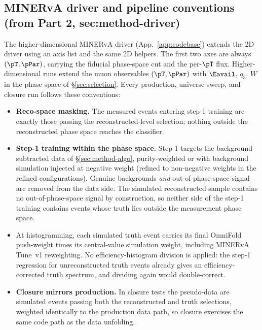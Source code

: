 \subsection{MINERvA driver and pipeline conventions (from Part 2, sec:method-driver)}
The higher-dimensional MINERvA driver (App.~\ref{app:codebase}) extends the 2D driver using an axis list and the same 2D helpers. The first two axes are always $(\pT,\pPar)$, carrying the fiducial phase-space cut and the per-$\pT$ flux. Higher-dimensional runs extend the muon observables $(\pT,\pPar)$ with $\Eavail$, $q_{3}$, $W$ in the phase space of \S\ref{sec:selection}. Every production, universe-sweep, and closure run follows these conventions:
\begin{itemize}[itemsep=2pt]
  \item \textbf{Reco-space masking.} The measured events entering step-1 training are exactly those passing the reconstructed-level selection; nothing outside the reconstructed phase space reaches the classifier.
  \item \textbf{Step-1 training within the phase space.} Step 1 targets the background-subtracted data of \S\ref{sec:method-algo}, purity-weighted or with background simulation injected at negative weight (refined to non-negative weights in the refined configurations). Genuine backgrounds \emph{and} out-of-phase-space signal are removed from the data side. The simulated reconstructed sample contains no out-of-phase-space signal by construction, so neither side of the step-1 training contains events whose truth lies outside the measurement phase space.
  \item At histogramming, each simulated truth event carries its final OmniFold push-weight times its central-value simulation weight, including MINERvA Tune~v1 reweighting. No efficiency-histogram division is applied: the step-1 regression for unreconstructed truth events already gives an efficiency-corrected truth spectrum, and dividing again would double-correct.
  \item \textbf{Closure mirrors production.} In closure tests the pseudo-data are simulated events passing both the reconstructed and truth selections, weighted identically to the production data path, so closure exercises the same code path as the data unfolding.
\end{itemize}

